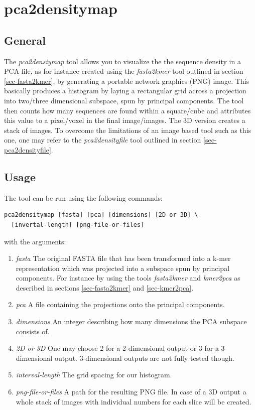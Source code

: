 \section{pca2densitymap} \label{sec-pca2densitymap}

\subsection{General}

The \emph{pca2densiymap} tool allows you to visualize the the sequence density
in a PCA file, as for instance created using the \emph{fasta2kmer} tool
outlined in section \ref{sec-fasta2kmer},
by generating a portable network graphics (PNG) image. This basically 
produces a histogram by laying a rectangular grid across a projection
into two/three dimensional subspace, spun by principal components. The
tool then counts how many sequences are found within a square/cube
and attributes this value to a pixel/voxel in the final
image/images. The 3D version creates a stack of images. To overcome
the limitations of an image based tool such as this one,
one may refer to the \emph{pca2densityfile} tool outlined in section
\ref{sec-pca2densityfile}. 

\subsection{Usage}

The tool can be run using the following commands:
\begin{lstlisting}
pca2densitymap [fasta] [pca] [dimensions] [2D or 3D] \
  [invertal-length] [png-file-or-files]
\end{lstlisting}
with the arguments:
\begin{enumerate}
  \item \emph{fasta} The original FASTA file that has been transformed
    into a k-mer representation which was projected into a subspace
    spun by principal components. For instance by using the tools
    \emph{fasta2kmer} and \emph{kmer2pca} as described in sections
    \ref{sec-fasta2kmer} and \ref{sec-kmer2pca}.
  \item \emph{pca} A file containing the projections onto the
    principal components.
  \item \emph{dimensions} An integer describing how many dimensions
    the PCA subspace consists of.
  \item \emph{2D or 3D} One may choose 2 for a 2-dimensional output or 3 for a
    3-dimensional output. 3-dimensional outputs are not fully tested
    though.
  \item \emph{interval-length} The grid spacing for our histogram.
  \item \emph{png-file-or-files} A path for the resulting PNG file. In
    case of a 3D output a whole stack of images with individual
    numbers for each slice will be created.  
\end{enumerate}

